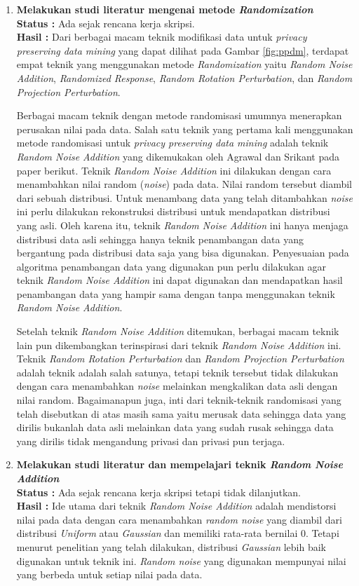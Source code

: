 \documentclass[a4paper,twoside]{article}
\begin{document}
\begin{enumerate}
		\item \textbf{Melakukan studi literatur mengenai metode \textit{Randomization}}\\
		{\bf Status :} Ada sejak rencana kerja skripsi.\\
		{\bf Hasil :} Dari berbagai macam teknik modifikasi data untuk \textit{privacy preserving data mining} yang dapat dilihat pada Gambar \ref{fig:ppdm}, terdapat empat teknik yang menggunakan metode \textit{Randomization} yaitu \textit{Random Noise Addition}, \textit{Randomized Response}, \textit{Random Rotation Perturbation}, dan \textit{Random Projection Perturbation}.

		Berbagai macam teknik dengan metode randomisasi umumnya menerapkan perusakan nilai pada data. Salah satu teknik yang pertama kali menggunakan metode randomisasi untuk \textit{privacy preserving data mining} adalah teknik \textit{Random Noise Addition} yang dikemukakan oleh Agrawal dan Srikant pada paper berikut. Teknik \textit{Random Noise Addition} ini dilakukan dengan cara menambahkan nilai random (\textit{noise}) pada data. Nilai random tersebut diambil dari sebuah distribusi. Untuk menambang data yang telah ditambahkan \textit{noise} ini perlu dilakukan rekonstruksi distribusi untuk mendapatkan distribusi yang asli. Oleh karena itu, teknik \textit{Random Noise Addition} ini hanya menjaga distribusi data asli sehingga hanya teknik penambangan data yang bergantung pada distribusi data saja yang bisa digunakan. Penyesuaian pada algoritma penambangan data yang digunakan pun perlu dilakukan agar teknik \textit{Random Noise Addition} ini dapat digunakan dan mendapatkan hasil penambangan data yang hampir sama dengan tanpa menggunakan teknik \textit{Random Noise Addition}.
		
		Setelah teknik \textit{Random Noise Addition} ditemukan, berbagai macam teknik lain pun dikembangkan terinspirasi dari teknik \textit{Random Noise Addition} ini. Teknik \textit{Random Rotation Perturbation} dan \textit{Random Projection Perturbation} adalah teknik adalah salah satunya, tetapi teknik tersebut tidak dilakukan dengan cara menambahkan \textit{noise} melainkan mengkalikan data asli dengan nilai random. Bagaimanapun juga, inti dari teknik-teknik randomisasi yang telah disebutkan di atas masih sama yaitu merusak data sehingga data yang dirilis bukanlah data asli melainkan data yang sudah rusak sehingga data yang dirilis tidak mengandung privasi dan privasi pun terjaga.
		
		\item \textbf{Melakukan studi literatur dan mempelajari teknik \textit{Random Noise Addition}}\\
		{\bf Status :} Ada sejak rencana kerja skripsi tetapi tidak dilanjutkan.\\
		{\bf Hasil :} Ide utama dari teknik \textit{Random Noise Addition} adalah mendistorsi nilai pada data dengan cara menambahkan \textit{random noise} yang diambil dari distribusi \textit{Uniform} atau \textit{Gaussian} dan memiliki rata-rata bernilai 0. Tetapi menurut penelitian yang telah dilakukan, distribusi \textit{Gaussian} lebih baik digunakan untuk teknik ini. \textit{Random noise} yang digunakan mempunyai nilai yang berbeda untuk setiap nilai pada data.


\end{enumerate}
\end{document}
